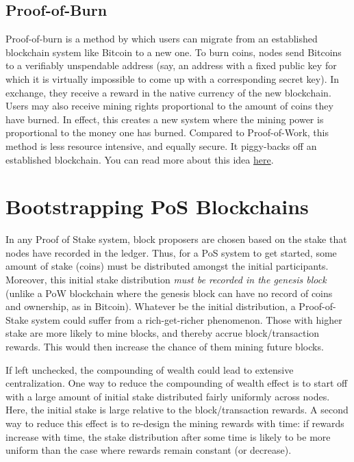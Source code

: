 \documentclass{article}
\begin{document}
\subsection*{Proof-of-Burn}

Proof-of-burn is a method by which users can migrate from an established blockchain system like Bitcoin to a new one. To burn coins, nodes send Bitcoins to a verifiably unspendable address (say, an address with a fixed public key for which it is virtually impossible to come up with a corresponding secret key). In exchange, they receive a reward in the native currency of the new blockchain. Users may also receive mining rights proportional to the amount of coins they have burned. In effect, this creates a new system where the mining power is proportional to the money one has burned. Compared to Proof-of-Work, this method is less resource intensive, and equally secure. It piggy-backs off an established blockchain. You can read more about this idea \href{https://en.bitcoin.it/wiki/Proof_of_burn}{here}.

\section*{Bootstrapping PoS Blockchains}
In any Proof of Stake system, block proposers are chosen based on the stake that nodes have recorded in the ledger. Thus, for a PoS system to get started, some amount of stake (coins) must be distributed amongst the initial participants. Moreover, this initial stake distribution {\em must be recorded in the genesis block} (unlike a PoW blockchain where the genesis block can have no record of coins and ownership, as in Bitcoin). Whatever be the initial distribution, a Proof-of-Stake system could suffer from a rich-get-richer phenomenon. Those with higher stake are more likely to mine blocks, and thereby accrue block/transaction rewards. This would then increase the chance of them mining future blocks. 

If left unchecked, the compounding of wealth could lead to extensive centralization. One way to reduce the compounding of wealth effect is to start off with a large amount of initial stake distributed fairly uniformly across nodes. Here, the initial stake is large relative to the block/transaction rewards. A second way to reduce this effect is to re-design the mining rewards with time: if rewards increase with time, the stake distribution after some time is likely to be more uniform than the case where rewards remain constant (or decrease).
\end{document}
